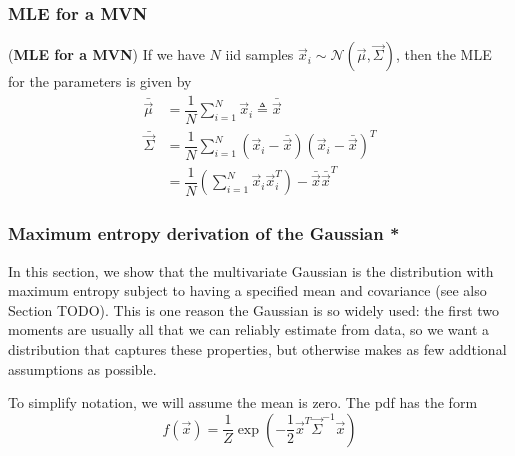 \subsubsection{MLE for a MVN}
\begin{theorem}(\textbf{MLE for a MVN})
	If we have $N$ iid samples $\vec{x}_i \sim \mathcal{N}(\vec{\mu},\vec{\Sigma})$, then the MLE for the parameters is given by
	\begin{align}
	\bar{\vec{\mu}}    & =\dfrac{1}{N}\sum\limits_{i=1}^N \vec{x}_i \triangleq \bar{\vec{x}} \\
	\bar{\vec{\Sigma}} & =\dfrac{1}{N}\sum\limits_{i=1}^N (\vec{x}_i-\bar{\vec{x}})(\vec{x}_i-\bar{\vec{x}})^T \\
	& =\dfrac{1}{N}\left(\sum\limits_{i=1}^N \vec{x}_i\vec{x}_i^T\right)-\bar{\vec{x}}\bar{\vec{x}}^T
	\end{align}
\end{theorem}


\subsubsection{Maximum entropy derivation of the Gaussian *}
In this section, we show that the multivariate Gaussian is the distribution with maximum entropy subject to having a specified mean and covariance (see also Section TODO). This is one reason the Gaussian is so widely used: the first two moments are usually all that we can reliably estimate from data, so we want a distribution that captures these properties, but otherwise makes as few addtional assumptions as possible.

To simplify notation, we will assume the mean is zero. The pdf has the form
\begin{equation}
f(\vec{x})=\dfrac{1}{Z}\exp\left(-\dfrac{1}{2}\vec{x}^T\vec{\Sigma}^{-1}\vec{x}\right)
\end{equation}


